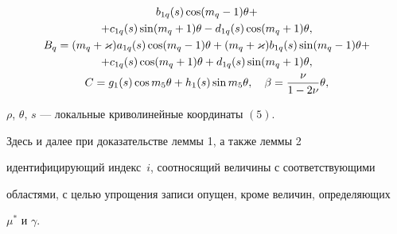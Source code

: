 \begin{lem}
\begin{gather}
b_{1q}(s)\cos(m_q-1)\theta+\notag \\ +c_{1q}(s)\sin(m_q+1)\theta- 


d_{1q}(s)\cos(m_q+1)\theta,\notag \\ 


% 


B_q=(m_q+\varkappa)a_{1q}(s)\cos(m_q-1)\theta+(m_q+\varkappa) 


b_{1q}(s)\sin(m_q-1)\theta+\notag \\ +c_{1q}(s)\cos(m_q+1)\theta+ 


d_{1q}(s)\sin(m_q+1)\theta,\notag \\ 


% 


C=g_1(s)\cos m_5\theta+h_1(s)\sin m_5\theta,\quad 


\beta=\frac{\nu}{1-2\nu}\theta, 


\end{gather} 


$\rho$, $\theta$, $s$ --- локальные криволинейные координаты $(5)$.  


\end{lem} 


 


Здесь и далее при доказательстве леммы 1, а также леммы 2  


идентифицирующий индекс~$i$, соотносящий величины с соответствующими  


областями, с целью упрощения записи опущен, кроме величин, определяющих  


$\mu^*$ и $\gamma$. 


 



